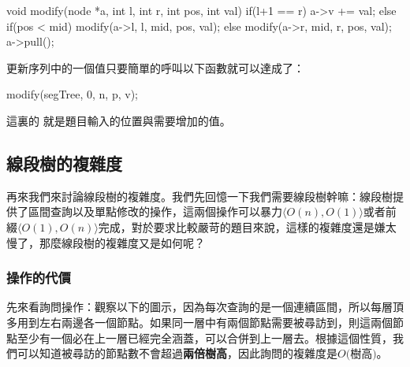 \begin{C++}
void modify(node *a, int l, int r, int pos, int val){
    if(l+1 == r) a->v += val;
    else if(pos < mid) modify(a->l, l, mid, pos, val);
    else modify(a->r, mid, r, pos, val);
    a->pull();
}
\end{C++}

更新序列中的一個值只要簡單的呼叫以下函數就可以達成了：

\begin{C++}
modify(segTree, 0, n, p, v);
\end{C++}

這裏的  就是題目輸入的位置與需要增加的值。

\subsection{線段樹的複雜度}

再來我們來討論線段樹的複雜度。我們先回憶一下我們需要線段樹幹嘛：線段樹提供了區間查詢以及單點修改的操作，這兩個操作可以暴力$\langle O(n), O(1)\rangle$或者前綴$\langle O(1), O(n)\rangle $完成，對於要求比較嚴苛的題目來說，這樣的複雜度還是嫌太慢了，那麼線段樹的複雜度又是如何呢？\\

\subsubsection{操作的代價}

先來看詢問操作：觀察以下的圖示，因為每次查詢的是一個連續區間，所以每層頂多用到左右兩邊各一個節點。如果同一層中有兩個節點需要被尋訪到，則這兩個節點至少有一個必在上一層已經完全涵蓋，可以合併到上一層去。根據這個性質，我們可以知道被尋訪的節點數不會超過\textbf{兩倍樹高}，因此詢問的複雜度是$O($樹高$)$。\\

\begin{center}

\end{center}

